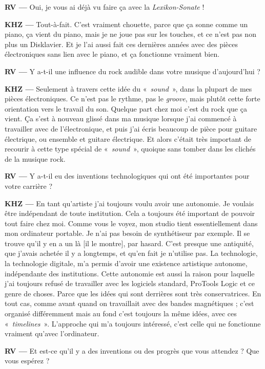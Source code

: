 \documentclass[a4paper,12pt]{article}
\newcommand{\guill}[1]{«~#1~»}
\begin{document}
\textbf{RV ---} Oui, je vous ai déjà vu faire ça avec la \emph{Lexikon-Sonate} !

\textbf{KHZ ---} Tout-à-fait. C'est vraiment chouette, parce que ça sonne comme un piano, ça vient du piano, mais je ne joue pas sur les touches, et ce n'est pas non plus un Disklavier. Et je l'ai aussi fait ces dernières années avec des pièces électroniques sans lien avec le piano, et ça fonctionne vraiment bien.

\textbf{RV ---} Y a-t-il une influence du rock audible dans votre musique d'aujourd'hui ?

\textbf{KHZ ---} Seulement à travers cette idée du \guill{\emph{sound}}, dans la plupart de mes pièces électroniques. Ce n'est pas le rythme, pas le \emph{groove}, mais plutôt cette forte orientation vers le travail du son. Quelque part chez moi c'est du rock que ça vient. Ça s'est à nouveau glissé dans ma musique lorsque j'ai commencé à travailler avec de l'électronique, et puis j'ai écris beaucoup de pièce pour guitare électrique, ou ensemble et guitare électrique. Et alors c'était très important de recourir à cette type spécial de \guill{\emph{sound}}, quoique sans tomber dans les clichés de la musique rock.

\textbf{RV ---} Y a-t-il eu des inventions technologiques qui ont été importantes pour votre carrière ?

\textbf{KHZ ---} En tant qu'artiste j'ai toujours voulu avoir une autonomie. Je voulais être indépendant de toute institution. Cela a toujours été important de pouvoir tout faire chez moi. Comme vous le voyez, mon studio tient essentiellement dans mon ordinateur portable. Je n'ai pas besoin de synthétiseur par exemple. Il se trouve qu'il y en a un là [il le montre], par hasard. C'est presque une antiquité, que j'avais achetée il y a longtemps, et qu'en fait je n'utilise pas. La technologie, la technologie digitale, m'a permis d'avoir une existence artistique autonome, indépendante des institutions. Cette autonomie est aussi la raison pour laquelle j'ai toujours refusé de travailler avec les logiciels standard, ProTools Logic et ce genre de choses. Parce que les idées qui sont derrières sont très conservatrices. En tout cas, comme avant quand on travaillait avec des bandes magnétiques ; c'est organisé différemment mais au fond c'est toujours la même idées, avec ces \guill{\emph{timelines}}. L'approche qui m'a toujours intéressé, c'est celle qui ne fonctionne vraiment qu'avec l'ordinateur.

\textbf{RV ---} Et est-ce qu'il y a des inventions ou des progrès que vous attendez ? Que vous espérez ?
\end{document}
